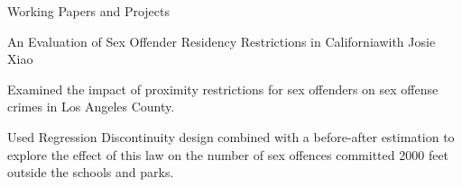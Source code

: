 \documentclass{resume} %
\begin{document}
\begin{rSection}{Working Papers and Projects}
\begin{rSubsection}{An Evaluation of Sex Offender Residency Restrictions in California}{}{with Josie Xiao}{}
\item Examined the impact of proximity restrictions for sex offenders on sex offense crimes in Los Angeles County.
\item Used Regression Discontinuity design combined with a before-after estimation to explore the effect of this law on the number of sex offences committed 2000 feet outside the schools and parks.
\end{rSubsection}
\iffalse
\begin{rSubsection}{Covid project}{December 2016}{}{}
\item Estimate average treatment effects associated with three COVID-19 policies – shelter in place, school closures and daycare closures – on family violence, as recorded in 911 calls and police incidents data across dozens of American cities.
\item present two-way fixed effects estimates alongside Callaway and Sant’Anna’s (2020) estimator for differential timing with heterogenous treatment effects.
Is able to solve 3x3 tile board in less than 1 second using the A* algorithm
\end{rSubsection}
\fi
\end{rSection}
\end{document}
